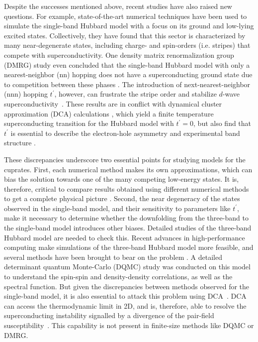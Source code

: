 \documentclass[reprint,nofootinbib,nobibnotes,amsmath,amssymb,aps,prb,floatfix]{revtex4-2}
\begin{document}
Despite the successes mentioned above, recent studies have also raised new questions. For example, state-of-the-art numerical techniques \cite{Zheng, Qin, JiangYF, JiangHC, Huang, LeBlancPRX} have been used to simulate the single-band Hubbard model with a focus on its ground and low-lying excited states. Collectively, they have found that this sector is characterized by many near-degenerate states, including charge- and spin-orders (i.e. stripes) that compete with superconductivity. One density matrix renormalization group (DMRG) study even concluded that the single-band Hubbard model with only a nearest-neighbor (nn) hopping does not have a superconducting ground state due to competition between these phases \cite{Qin}. The introduction of next-nearest-neighbor (nnn) hopping $t^\prime$, however, can frustrate the stripe order and stabilize $d$-wave superconductivity~\cite{JiangYF}. These results are in conflict with dynamical cluster approximation (DCA) calculations \cite{Maier1, Maier2}, which yield a finite temperature superconducting transition for the Hubbard model with $t^\prime = 0$, but also find that $t^\prime$ is essential to describe the electron-hole asymmetry \cite{Macridin} and experimental band structure \cite{Ogata}. 

These discrepancies underscore two essential points for studying models for the cuprates. First, each numerical method makes its own approximations, which can bias the solution towards one of the many competing low-energy states. It is, therefore, critical to compare results obtained using different numerical methods to get a complete physical picture \cite{LeBlancPRX}. Second, the near degeneracy of the states observed in the single-band model, and their sensitivity to parameters like $t^\prime$, make it necessary to determine whether the downfolding from the three-band to the single-band model introduces other biases. Detailed studies of the three-band Hubbard model are needed to check this.  
Recent advances in high-performance computing make simulations of the three-band Hubbard model more feasible, and several methods have been brought to bear on the problem \cite{Kung, Huang, White, Kent,  Biborski,  Weber, Mai}. A detailed determinant quantum Monte-Carlo (DQMC) study \cite{Kung} was conducted on this model to understand the spin-spin and density-density correlations, as well as the spectral function. But given the discrepancies between methods observed for the single-band model, it is also essential to attack this problem using DCA~\cite{Maier1}. DCA can access the thermodynamic limit in 2D, and is, therefore, able to resolve the superconducting instability signalled by a divergence of the pair-field susceptibility~\cite{Maier2}. This capability is not present in finite-size methods 
like DQMC or DMRG. 
\end{document}
